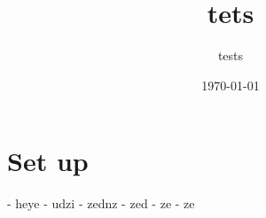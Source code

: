 \documentclass{article}%
\title{tets}%
\author{tests}%
\date{\today}%
\begin{document}
%
\pagestyle{empty}%
\normalsize%
\maketitle%
\section{ Set up
}%
\label{sec:Setup}%
{-} heye
%
{-} udzi
%
{-} zednz
%
{-} zed
%
{-} ze
%
{-} ze

%
\end{document}
